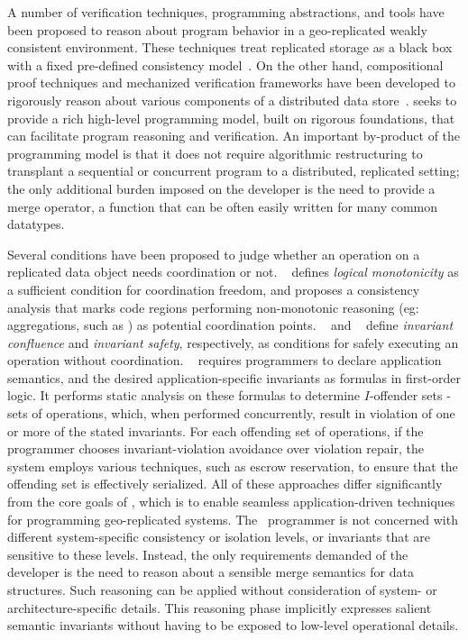 A number of verification techniques, programming abstractions, and
tools have been proposed to reason about program behavior in a
geo-replicated weakly consistent environment.  These techniques treat
replicated storage as a black box with a fixed pre-defined consistency
model~\cite{bailis-vldb, alvaro-calm, gotsman-popl16,redblue-atc,
  redblue-osdi, ecinec}.  On the other hand, compositional proof
techniques and mechanized verification frameworks have been developed
to rigorously reason about various components of a distributed data
store~\cite{verdi,lbc16}. \name seeks to provide a rich high-level
programming model, built on rigorous foundations, that can facilitate
program reasoning and verification.  An important by-product of the
programming model is that it does not require algorithmic
restructuring to transplant a sequential or concurrent program to a
distributed, replicated setting; the only additional burden imposed on
the developer is the need to provide a merge operator, a function that
can be often easily written for many common datatypes.

Several conditions have been proposed to judge whether an operation on
a replicated data object needs coordination or not. ~\cite{Calm}
defines \emph{logical monotonicity} as a sufficient condition for
coordination freedom, and proposes a consistency analysis that marks
code regions performing non-monotonic reasoning (eg: aggregations,
such as ) as potential coordination
points. ~\cite{IConfluence} and ~\cite{Sieve} define \emph{invariant
  confluence} and \emph{invariant safety}, respectively, as conditions
for safely executing an operation without coordination.
~\cite{indigo} requires programmers to declare application semantics,
and the desired application-specific invariants as formulas in
first-order logic. It performs static analysis on these formulas to
determine $I$-offender sets - sets of operations, which, when
performed concurrently, result in violation of one or more of the
stated invariants. For each offending set of operations, if the
programmer chooses invariant-violation avoidance over violation
repair, the system employs various techniques, such as escrow
reservation, to ensure that the offending set is effectively
serialized.  All of these approaches differ significantly from the
core goals of \name, which is to enable seamless application-driven
techniques for programming geo-replicated systems.  The
\name\ programmer is not concerned with different system-specific
consistency or isolation levels, or invariants that are sensitive to
these levels.  Instead, the only requirements demanded of the
developer is the need to reason about a sensible merge semantics for
data structures.  Such reasoning can be applied without consideration
of system- or architecture-specific details.  This reasoning phase
implicitly expresses salient semantic invariants without having to be
exposed to low-level operational details.

